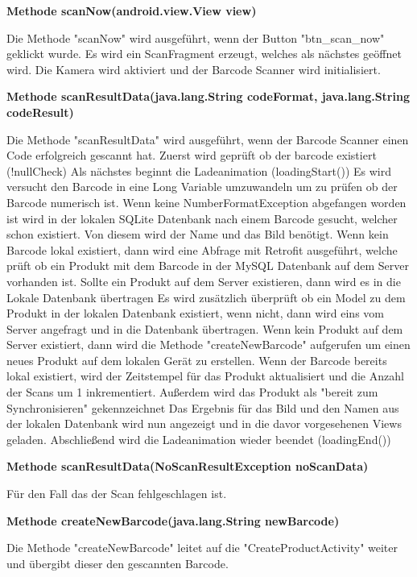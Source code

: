 \documentclass{scrartcl}
\begin{document}
\noindent\textbf{Methode scanNow(android.view.View view)}

\noindent Die Methode "scanNow" wird ausgeführt, wenn der Button "btn\_scan\_now" geklickt wurde. Es wird ein ScanFragment erzeugt, welches als nächstes geöffnet wird. Die Kamera wird aktiviert und der Barcode Scanner wird initialisiert. \newline

\noindent\textbf{Methode scanResultData(java.lang.String codeFormat, java.lang.String codeResult)}

\noindent Die Methode "scanResultData" wird ausgeführt, wenn der Barcode Scanner einen Code erfolgreich gescannt hat. Zuerst wird geprüft ob der barcode existiert (!nullCheck) Als nächstes beginnt die Ladeanimation (loadingStart()) Es wird versucht den Barcode in eine Long Variable umzuwandeln um zu prüfen ob der Barcode numerisch ist. Wenn keine NumberFormatException abgefangen worden ist wird in der lokalen SQLite Datenbank nach einem Barcode gesucht, welcher schon existiert. Von diesem wird der Name und das Bild benötigt. Wenn kein Barcode lokal existiert, dann wird eine Abfrage mit Retrofit ausgeführt, welche prüft ob ein Produkt mit dem Barcode in der MySQL Datenbank auf dem Server vorhanden ist. Sollte ein Produkt auf dem Server existieren, dann wird es in die Lokale Datenbank übertragen Es wird zusätzlich überprüft ob ein Model zu dem Produkt in der lokalen Datenbank existiert, wenn nicht, dann wird eins vom Server angefragt und in die Datenbank übertragen. Wenn kein Produkt auf dem Server existiert, dann wird die Methode "createNewBarcode" aufgerufen um einen neues Produkt auf dem lokalen Gerät zu erstellen. Wenn der Barcode bereits lokal existiert, wird der Zeitstempel für das Produkt aktualisiert und die Anzahl der Scans um 1 inkrementiert. Außerdem wird das Produkt als "bereit zum Synchronisieren" gekennzeichnet Das Ergebnis für das Bild und den Namen aus der lokalen Datenbank wird nun angezeigt und in die davor vorgesehenen Views geladen. Abschließend wird die Ladeanimation wieder beendet (loadingEnd()) \newline

\noindent\textbf{Methode scanResultData(NoScanResultException noScanData)}

\noindent Für den Fall das der Scan fehlgeschlagen ist. \newline

\noindent\textbf{Methode createNewBarcode(java.lang.String newBarcode)}

\noindent Die Methode "createNewBarcode" leitet auf die "CreateProductActivity" weiter und übergibt dieser den gescannten Barcode. \newline
\end{document}
